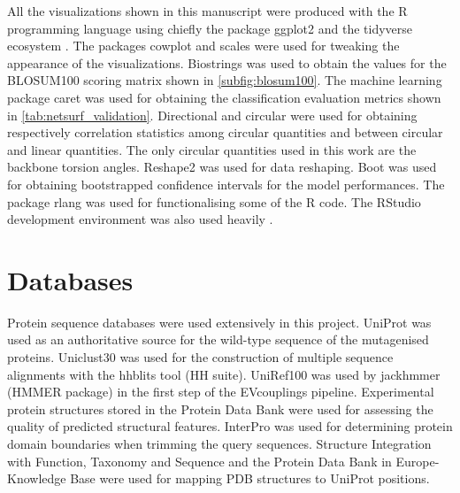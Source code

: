 All the visualizations shown in this manuscript were produced with the R programming language \parencite[version 4.0.5]{RCT2021} using chiefly the package ggplot2 \parencite[version 3.3.3]{Wickham2016} and the tidyverse ecosystem \parencite[version 1.3.1]{Wickham2019}.
The packages cowplot \parencite[version 1.1.1]{Wilke2020} and scales \parencite[version 1.1.1]{Wickham2020} were used for tweaking the appearance of the visualizations.
Biostrings \parencite[version 2.56.0]{Pages2020} was used to obtain the values for the BLOSUM100 scoring matrix \parencite{Henikoff1992} shown in \autoref{subfig:blosum100}.
The machine learning package caret \parencite[version 6.0--88]{Kuhn2021} was used for obtaining the classification evaluation metrics shown in \autoref{tab:netsurf_validation}.
Directional \parencite[version 4.9]{Tsagris2021} and circular \parencite[version 0.4--93]{Agostinelli2017} were used for obtaining respectively correlation statistics among circular quantities and between circular and linear quantities.
The only circular quantities used in this work are the backbone torsion angles.
Reshape2 \parencite[version 1.4.4]{Wickham2007} was used for data reshaping.
Boot \parencite[version 1.3--28]{Canty2021} was used for obtaining bootstrapped confidence intervals for the model performances.
The package rlang \parencite[version 0.4.11]{Henry2021} was used for functionalising some of the R code.
The RStudio development environment was also used heavily \parencite[version 1.4.1103 ``Wax Begonia'']{RStudioTeam2021}.

\section{Databases}
Protein sequence databases were used extensively in this project.
UniProt \parencite[release \texttt{2021\_02}]{Bateman2020} was used as an authoritative source for the wild-type sequence of the mutagenised proteins.
Uniclust30 \parencite[release \texttt{2020\_06}]{Mirdita2016} was used for the construction of multiple sequence alignments with the hhblits tool (HH suite).
UniRef100 \parencite[release \texttt{2021\_4}]{Suzek2014} was used by jackhmmer (HMMER package) in the first step of the EVcouplings pipeline.
Experimental protein structures stored in the Protein Data Bank \parencite[PDB,][accessed in March 2021]{Burley2018} were used for assessing the quality of predicted structural features.
InterPro \parencite[release 84.0]{Blum2020} was used for determining protein domain boundaries when trimming the query sequences.
Structure Integration with Function, Taxonomy and Sequence \parencite[SIFTS,][accessed in March 2021]{Dana2018} and the Protein Data Bank in Europe-Knowledge Base \parencite[PDBe-KB,][accessed in March 2021]{Varadi2019} were used for mapping PDB structures to UniProt positions.

